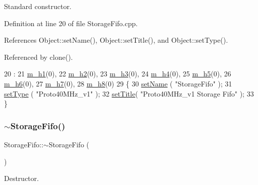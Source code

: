 Standard constructor. 



Definition at line 20 of file Storage\+Fifo.\+cpp.



References Object\+::set\+Name(), Object\+::set\+Title(), and Object\+::set\+Type().



Referenced by clone().


\begin{DoxyCode}
20                            :
21   \hyperlink{classStorageFifo_abe762844e442bc8188643b18b276d801}{m\_h1}(0),
22   \hyperlink{classStorageFifo_a3caf6211541aaa4be8e60c03d79bf253}{m\_h2}(0),
23   \hyperlink{classStorageFifo_a7e6b54c96a9b53a9917f7f21bda12b2e}{m\_h3}(0),
24   \hyperlink{classStorageFifo_ad026ffc1c7590bb3563538490be9aa00}{m\_h4}(0),
25   \hyperlink{classStorageFifo_ae9133c5421f9fa166b837933706d2a59}{m\_h5}(0),
26   \hyperlink{classStorageFifo_a39ca376b2a74643c54e4df2dfabf0906}{m\_h6}(0),
27   \hyperlink{classStorageFifo_a01784ff4138a1b32eb517931b5866cc6}{m\_h7}(0),
28   \hyperlink{classStorageFifo_aeef4b7183e14d05bab673d948d85b84c}{m\_h8}(0)
29 \{
30   \hyperlink{classObject_ae30fea75683c2d149b6b6d17c09ecd0c}{setName} ( \textcolor{stringliteral}{"StorageFifo"} );
31   \hyperlink{classObject_aae534cc9d982bcb9b99fd505f2e103a5}{setType} ( \textcolor{stringliteral}{"Proto40MHz\_v1"} );
32   \hyperlink{classObject_a89557dbbad5bcaa02652f5d7fa35d20f}{setTitle}( \textcolor{stringliteral}{"Proto40MHz\_v1 Storage Fifo"} );
33 \}
\end{DoxyCode}
\mbox{\label{classStorageFifo_a5c464d5913f8857b54462f982bfa8ea3}} 
\subsubsection{\texorpdfstring{$\sim$\+Storage\+Fifo()}{~StorageFifo()}}
{\footnotesize\ttfamily Storage\+Fifo\+::$\sim$\+Storage\+Fifo (\begin{DoxyParamCaption}{ }\end{DoxyParamCaption})\hspace{0.3cm}{\ttfamily [virtual]}}



Destructor. 



